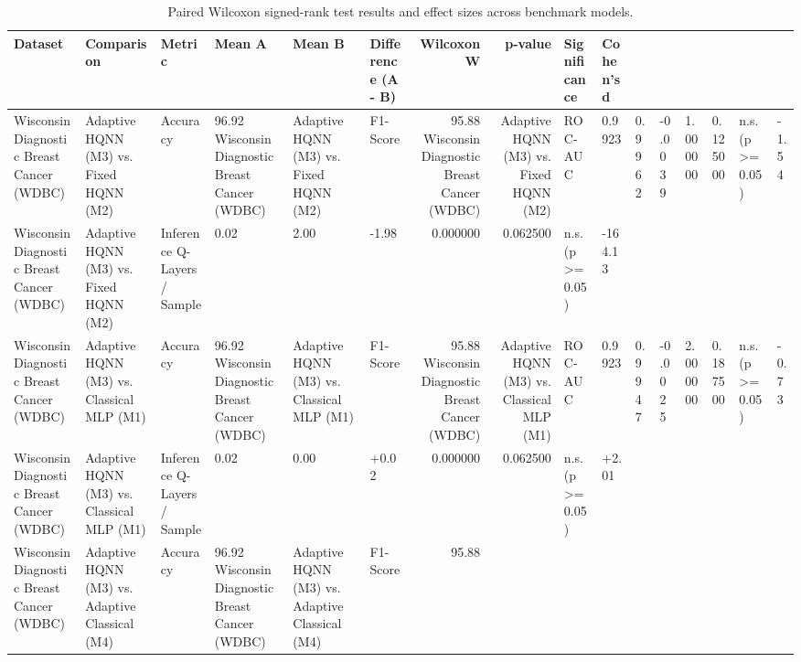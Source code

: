 \begin{table}
\caption{Paired Wilcoxon signed-rank test results and effect sizes across benchmark models.}
\label{tab:statistical_tests}
\begin{tabular}{llllllrrll}
\toprule
Dataset & Comparison & Metric & Mean A & Mean B & Difference (A - B) & Wilcoxon W & p-value & Significance & Cohen's d \\
\midrule
Wisconsin Diagnostic Breast Cancer (WDBC) & Adaptive HQNN (M3) vs. Fixed HQNN (M2) & Accuracy & 96.92%
Wisconsin Diagnostic Breast Cancer (WDBC) & Adaptive HQNN (M3) vs. Fixed HQNN (M2) & F1-Score & 95.88%
Wisconsin Diagnostic Breast Cancer (WDBC) & Adaptive HQNN (M3) vs. Fixed HQNN (M2) & ROC-AUC & 0.9923 & 0.9962 & -0.0039 & 1.000000 & 0.125000 & n.s. (p >= 0.05) & -1.54 \\
Wisconsin Diagnostic Breast Cancer (WDBC) & Adaptive HQNN (M3) vs. Fixed HQNN (M2) & Inference Q-Layers / Sample & 0.02 & 2.00 & -1.98 & 0.000000 & 0.062500 & n.s. (p >= 0.05) & -164.13 \\
Wisconsin Diagnostic Breast Cancer (WDBC) & Adaptive HQNN (M3) vs. Classical MLP (M1) & Accuracy & 96.92%
Wisconsin Diagnostic Breast Cancer (WDBC) & Adaptive HQNN (M3) vs. Classical MLP (M1) & F1-Score & 95.88%
Wisconsin Diagnostic Breast Cancer (WDBC) & Adaptive HQNN (M3) vs. Classical MLP (M1) & ROC-AUC & 0.9923 & 0.9947 & -0.0025 & 2.000000 & 0.187500 & n.s. (p >= 0.05) & -0.73 \\
Wisconsin Diagnostic Breast Cancer (WDBC) & Adaptive HQNN (M3) vs. Classical MLP (M1) & Inference Q-Layers / Sample & 0.02 & 0.00 & +0.02 & 0.000000 & 0.062500 & n.s. (p >= 0.05) & +2.01 \\
Wisconsin Diagnostic Breast Cancer (WDBC) & Adaptive HQNN (M3) vs. Adaptive Classical (M4) & Accuracy & 96.92%
Wisconsin Diagnostic Breast Cancer (WDBC) & Adaptive HQNN (M3) vs. Adaptive Classical (M4) & F1-Score & 95.88%

\end{tabular}
\end{table}
